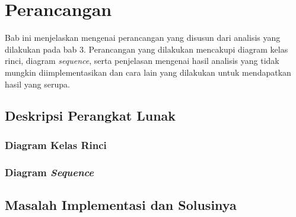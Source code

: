\chapter{Perancangan}
\label{chap:perancangan}

Bab ini menjelaskan mengenai perancangan yang disusun dari analisis yang dilakukan pada bab 3. Perancangan yang dilakukan mencakupi diagram kelas rinci, diagram \textit{sequence}, serta penjelasan mengenai hasil analisis yang tidak mungkin diimplementasikan dan cara lain yang dilakukan untuk mendapatkan hasil yang serupa.



\section{Deskripsi Perangkat Lunak}
\label{sec:deskripsi_perangkat_lunak}

\subsection{Diagram Kelas Rinci}
\label{sec:diagram_kelas_rinci}

\subsection{Diagram \textit{Sequence}}
\label{sec:diagram_sequence}



\section{Masalah Implementasi dan Solusinya}
\label{sec:masalah_implementasi}

